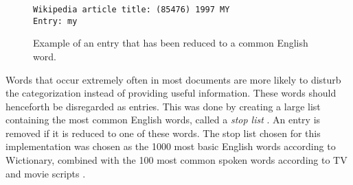 
\begin{figure}[h]
\centering
\begin{lstlisting}
Wikipedia article title: (85476) 1997 MY
Entry: my
\end{lstlisting}
\caption{Example of an entry that has been reduced to a common English word. }
\label{fig:common_word}
\end{figure}

Words that occur extremely often in most documents are more likely to disturb the categorization instead of providing useful information. These words should henceforth be disregarded as entries. This was done by creating a large list containing the most common English words, called a \emph{stop list} \cite[p.~ 25]{iirbook} . An entry is removed if it is reduced to one of these words. The stop list chosen for this implementation was chosen as the 1000 most basic English words according to Wictionary, combined with the 100 most common spoken words according to TV and movie scripts \cite{wiki:freqwordlist}.

